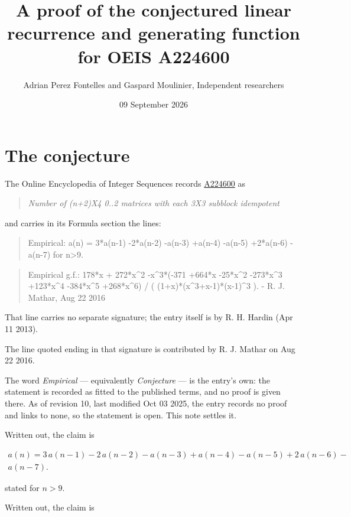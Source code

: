 \documentclass[11pt]{article}
\title{A proof of the conjectured linear recurrence and generating function for OEIS A224600}
\author{Adrian Perez Fontelles and Gaspard Moulinier, Independent researchers}
\date{09 September 2026}
\theoremstyle{definition}
\begin{document}
\maketitle
\section{The conjecture}

The Online Encyclopedia of Integer Sequences records \href{https://oeis.org/A224600}{A224600} as

\begin{quote}\itshape Number of (n+2)X4 0..2 matrices with each 3X3 subblock idempotent\end{quote}

and carries in its Formula section the lines:

\begin{quote}\ttfamily Empirical: a(n) = 3*a(n-1) -2*a(n-2) -a(n-3) +a(n-4) -a(n-5) +2*a(n-6) -a(n-7) for n>9.\end{quote}

\begin{quote}\ttfamily Empirical g.f.: 178*x + 272*x\textasciicircum{}2 -x\textasciicircum{}3*(-371 +664*x -25*x\textasciicircum{}2 -273*x\textasciicircum{}3 +123*x\textasciicircum{}4 -384*x\textasciicircum{}5 +268*x\textasciicircum{}6) / ( (1+x)*(x\textasciicircum{}3+x-1)*(x-1)\textasciicircum{}3 ). - R. J. Mathar, Aug 22 2016\end{quote}

That line carries no separate signature; the entry itself is by R. H. Hardin (Apr 11 2013).

The line quoted ending in that signature is contributed by R. J. Mathar on Aug 22 2016.

The word {\itshape Empirical} --- equivalently {\itshape Conjecture} --- is the entry's own: the statement is recorded as fitted to the published terms, and no proof is given there. As of revision 10, last modified Oct 03 2025, the entry records no proof and links to none, so the statement is open. This note settles it.

Written out, the claim is

\begin{multline*} a(n) = 3\,a(n-1) - 2\,a(n-2) - a(n-3) + a(n-4) - a(n-5) + 2\,a(n-6) - \\ a(n-7). \end{multline*}

stated for $n > 9$.

Written out, the claim is
\end{document}
